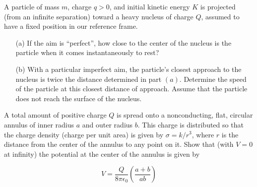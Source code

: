\documentclass[11pt,letterpaper,boxed]{hmcpset}
\begin{document}
	\begin{solution}
		\vfill
	\end{solution}
	\newpage
	
	
	\begin{problem}[HRK P28.6]
		A particle of mass $m$, charge $q>0$, and initial kinetic energy $K$ is projected (from an infinite separation) toward a heavy nucleus of charge $Q$, assumed to have a fixed position in our reference frame.
		
		\begin{enumerate}
			\item [(a)] If the aim is ``perfect'', how close to the center of the nucleus is the particle when it comes instantaneously to rest?
			\item [(b)] With a particular imperfect aim, the particle's closest approach to the nucleus is twice the distance determined in part $(a)$. Determine the speed of the particle at this closest distance of approach. Assume that the particle does not reach the surface of the nucleus.
		\end{enumerate}

		
	\end{problem}
	
	\begin{solution}
		\vfill
	\end{solution}
	\newpage
	
	
	\begin{problem}[HRK P28.10]
		A total amount of positive charge $Q$ is spread onto a nonconducting, flat, circular annulus of inner radius $a$ and outer radius $b$. This charge is distributed so that the charge density (charge per unit area) is given by $\sigma = k/r^3$, where $r$ is the distance from the center of the annulus to any point on it. Show that (with $V = 0$ at infinity) the potential at the center of the annulus is given by
		
		\[V = \frac{Q}{8\pi \epsilon_0}\left(\frac{a+b}{ab}\right)\]
		
	\end{problem}
	
	\begin{solution}
		\vfill
	\end{solution}
	
	
\end{document}
